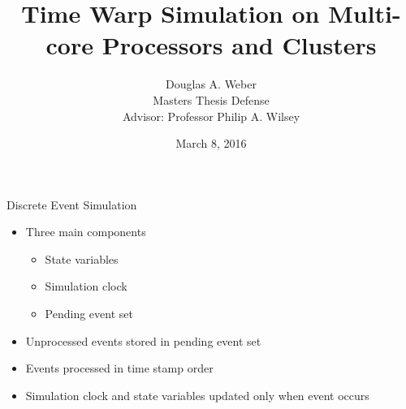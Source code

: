 \documentclass[10pt]{beamer}
\title{Time Warp Simulation on Multi-core Processors and Clusters}
\author{
    Douglas A. Weber \\
    Masters Thesis Defense \\
    Advisor: Professor Philip A. Wilsey
}
\institute{University of Cincinnati}
\date{March 8, 2016}
\begin{document}
\begin{frame}
  \titlepage
\end{frame}

\begin{frame}{Discrete Event Simulation}
    \begin{itemize}
        \item Three main components
            \begin{itemize}
                \item State variables
                \item Simulation clock
                \item Pending event set
            \end{itemize}
        \bigskip
        \item Unprocessed events stored in pending event set
        \item Events processed in time stamp order
        \item Simulation clock and state variables updated only when event occurs
    \end{itemize}
\end{frame}
\end{document}
